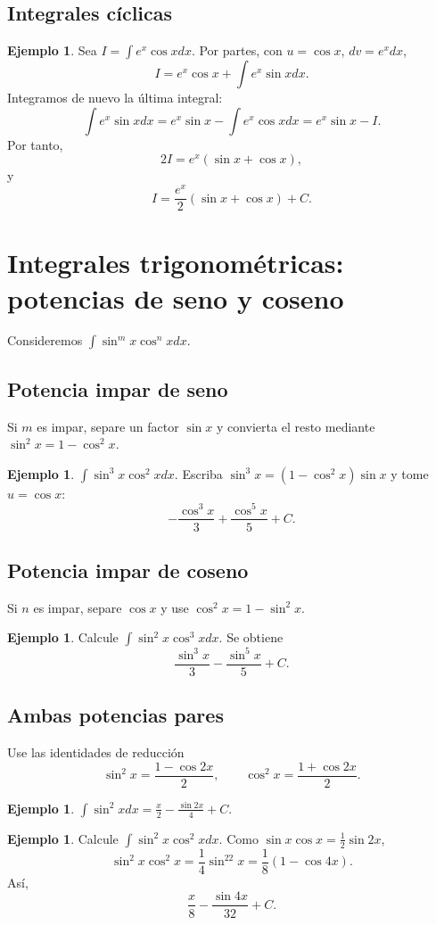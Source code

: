 \documentclass[12pt]{article}
\theoremstyle{definition}\newtheorem{definicion}[teorema]{Definición}\newtheorem{ejemplo}[teorema]{Ejemplo}\newtheorem{ejercicio}[teorema]{Ejercicio}
\theoremstyle{remark}\newtheorem*{observacion}{Observación}\newtheorem*{advertencia}{Advertencia}\newtheorem*{estrategia}{Estrategia}
\begin{document}
\subsection{Integrales cíclicas}
\begin{ejemplo}Sea $I=\int e^x\cos xdx$. Por partes, con $u=\cos x$, $dv=e^xdx$,
\[I=e^x\cos x+\int e^x\sin xdx.\]
Integramos de nuevo la última integral:
\[\int e^x\sin xdx=e^x\sin x-\int e^x\cos xdx=e^x\sin x-I.\]
Por tanto,
\[2I=e^x(\sin x+\cos x),\]
y
\[\boxed{I=\frac{e^x}{2}(\sin x+\cos x)+C}.\]\end{ejemplo}

\section{Integrales trigonométricas: potencias de seno y coseno}
Consideremos $\int\sin^m x\cos^n xdx$.
\subsection{Potencia impar de seno}
Si $m$ es impar, separe un factor $\sin x$ y convierta el resto mediante $\sin^2x=1-\cos^2x$.
\begin{ejemplo}$\int\sin^3x\cos^2x dx$. Escriba $\sin^3x=(1-\cos^2x)\sin x$ y tome $u=\cos x$:
\[\boxed{-\frac{\cos^3x}{3}+\frac{\cos^5x}{5}+C}.\]\end{ejemplo}
\subsection{Potencia impar de coseno}
Si $n$ es impar, separe $\cos x$ y use $\cos^2x=1-\sin^2x$.
\begin{ejemplo}Calcule $\int\sin^2x\cos^3x dx$. Se obtiene\[\boxed{\frac{\sin^3x}{3}-\frac{\sin^5x}{5}+C}.\]\end{ejemplo}
\subsection{Ambas potencias pares}
Use las identidades de reducción
\[\sin^2x=\frac{1-\cos2x}{2},\qquad\cos^2x=\frac{1+\cos2x}{2}.\]
\begin{ejemplo}$\int\sin^2x dx=\boxed{\frac{x}{2}-\frac{\sin2x}{4}+C}$.\end{ejemplo}
\begin{ejemplo}Calcule $\int\sin^2x\cos^2x dx$. Como $\sin x\cos x=\frac12\sin2x$,
\[\sin^2x\cos^2x=\frac14\sin^22x=\frac18(1-\cos4x).\]
Así,
\[\boxed{\frac{x}{8}-\frac{\sin4x}{32}+C}.\]\end{ejemplo}
\end{document}
